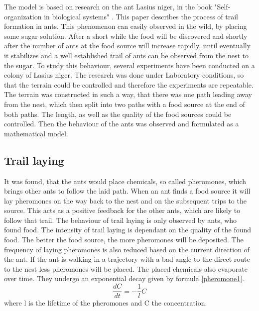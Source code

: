The model is based on research on the ant Lasius niger, in the book "Self-organization in biological systems" \citep{camazine2003}. This paper describes the process of trail formation in ants. This phenomenon can easily observed in the wild, by placing some sugar solution. After a short while the food will be discovered and shortly after the number of ants at the food source will increase rapidly, until eventually it stabilizes and a well established trail of ants can be observed from the nest to the sugar. To study this behaviour, several experiments have been conducted on a colony of Lasius niger. The research was done under Laboratory conditions, so that the terrain could be controlled and therefore the experiments are repeatable. The terrain was constructed in such a way, that there was one path leading away from the nest, which then split into two paths with a food source at the end of both paths. The length, as well as the quality of the food sources could be controlled. Then the behaviour of the ants was observed and formulated as a mathematical model.
\subsection{Trail laying}
 It was found, that the ants would place chemicals, so called pheromones, which brings other ants to follow the laid path. When an ant finds a food source it will lay pheromones on the way back to the nest and on the subsequent trips to the source. This acts as a positive feedback for the other ants, which are likely to follow that trail. The behaviour of trail laying is only observed by ants, who found food. The intensity of trail laying is dependant on the quality of the found food. The better the food source, the more pheromones will be deposited. The frequency of laying pheromones is also reduced based on the current direction of the ant. If the ant is walking in a trajectory with a bad angle to the direct route to the nest less pheromones will be placed. The placed chemicals also evaporate over time. They undergo an exponential decay given by formula \ref{pheromone1}.
 \begin{equation} \label{pheromone1}
  \frac{dC}{dt}=-\frac{1}{l}C
 \end{equation}
 where l is the lifetime of the pheromones and C the concentration.
